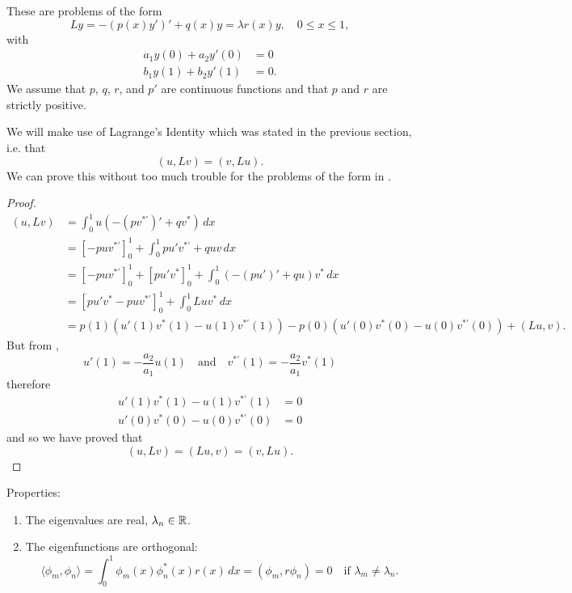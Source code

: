 These are problems of the form
\begin{equation}\label{eq:sturmliou}
	Ly = -\left(p(x)y'\right)' + q(x)y = \lambda r(x)y, \quad 0 \leq x \leq 1,
\end{equation}
with
\begin{equation}\label{eq:sturmliouconds}
	\begin{alignedat}{1}
		a_1y(0) + a_2y'(0) &= 0 \\
		b_1y(1) + b_2y'(1) &= 0.
	\end{alignedat}
\end{equation}
We assume that $p$, $q$, $r$, and $p'$ are continuous functions and that $p$ and $r$ are strictly positive.

We will make use of Lagrange's Identity which was stated in the previous section, i.e. that
\[
(u, Lv) = (v, Lu).
\]
We can prove this without too much trouble for the problems of the form in .

\begin{proof}
	\begin{align*}
		(u, Lv) &= \int_0^1 u\left(-(pv^{*\prime})' + qv^*\right) \,dx \\
		&= \left[-puv^{*\prime}\right]_0^1 + \int_0^1 pu'v^{*\prime} + quv \,dx \\
		&= \left[-puv^{*\prime}\right]_0^1 + \left[pu'v^*\right]_0^1 + \int_0^1 (-(pu')' + qu)v^* \,dx \\
		&= \left[pu'v^*-puv^{*\prime}\right]_0^1 + \int_0^1 Luv^* \,dx \\
		&= p(1)\left(u'(1)v^*(1) - u(1)v^{*\prime}(1)\right) - p(0)\left(u'(0)v^*(0) - u(0)v^{*\prime}(0)\right) + (Lu, v).
	\end{align*}
	But from ,
	\[
	u'(1) = -\frac{a_2}{a_1}u(1) \quad\text{and}\quad v^{*\prime}(1) = -\frac{a_2}{a_1}v^*(1)
	\]
	therefore
	\begin{align*}
		u'(1)v^*(1) - u(1)v^{*\prime}(1) &= 0 \\
		u'(0)v^*(0) - u(0)v^{*\prime}(0) &= 0
	\end{align*}
	and so we have proved that
	\[
	(u, Lv) = (Lu, v) = (v, Lu).
	\]
\end{proof}

Properties:
\begin{enumerate}
	\item The eigenvalues are real, $\lambda_n \in \mathbb{R}$.
	\item The eigenfunctions are orthogonal:
	\[
	\langle \phi_m, \phi_n \rangle = \int_0^1 \phi_m(x)\phi_n^*(x)r(x) \,dx = (\phi_m, r\phi_n) = 0 \quad \text{if } \lambda_m \neq \lambda_n.
	\]
\end{enumerate}

